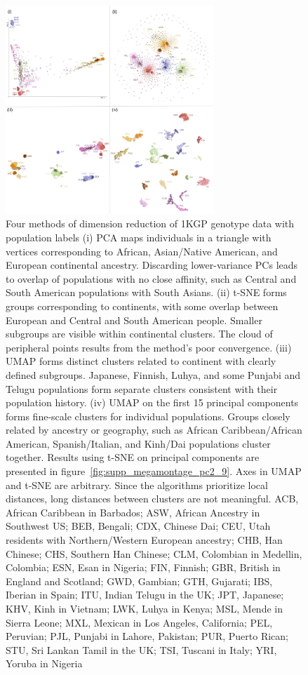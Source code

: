 \documentclass[12pt]{pnas-new}
\begin{document}
\begin{figure}[!ht]
    \centering
    \includegraphics[width=0.7\textwidth]{images/montage_1000G_labels_axes.pdf}
    \caption{Four methods of dimension reduction of 1KGP genotype data with population labels (i) PCA maps individuals in a triangle with vertices corresponding to African, Asian/Native American, and European continental ancestry. Discarding lower-variance PCs leads to overlap of populations with no close affinity, such as Central and South American populations with South Asians. (ii) t-SNE forms groups corresponding to continents, with some overlap between European and Central and South American people. Smaller subgroups are visible within continental clusters. The cloud of peripheral points results from the method's poor convergence. (iii) UMAP forms distinct clusters related to continent with clearly defined subgroups. Japanese, Finnish, Luhya, and some Punjabi and Telugu populations form separate clusters consistent with their population history\cite{10002015global}. (iv) UMAP on the first 15 principal components forms fine-scale clusters for individual populations. Groups closely related by ancestry or geography, such as African Caribbean/African American, Spanish/Italian, and Kinh/Dai populations cluster together. Results using t-SNE on principal components are presented in figure~\ref{fig:supp_megamontage_pc2_9}. Axes in UMAP and t-SNE are arbitrary. Since the algorithms prioritize local distances, long distances between clusters are not meaningful.
    ACB, African Caribbean in Barbados;
    ASW, African Ancestry in Southwest US;
    BEB, Bengali;
    CDX, Chinese Dai;
    CEU, Utah residents with Northern/Western European ancestry;
    CHB, Han Chinese;
    CHS, Southern Han Chinese;
    CLM, Colombian in Medellin, Colombia;
    ESN, Esan in Nigeria;
    FIN, Finnish;
    GBR, British in England and Scotland;
    GWD, Gambian;
    GTH, Gujarati;
    IBS, Iberian in Spain;
    ITU, Indian Telugu in the UK;
    JPT, Japanese;
    KHV, Kinh in Vietnam;
    LWK, Luhya in Kenya;
    MSL, Mende in Sierra Leone;
    MXL, Mexican in Los Angeles, California;
    PEL, Peruvian;
    PJL, Punjabi in Lahore, Pakistan;
    PUR, Puerto Rican;
    STU, Sri Lankan Tamil in the UK;
    TSI, Tuscani in Italy;
    YRI, Yoruba in Nigeria}
    \label{fig:1000g_compare}
\end{figure}
\end{document}
